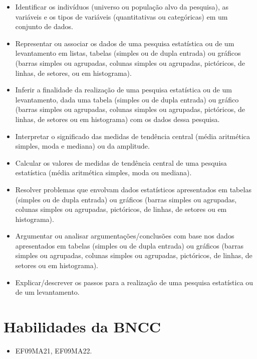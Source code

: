 \begin{itemize}

  \item Identificar os indivíduos (universo ou população alvo da pesquisa), as
variáveis e os tipos de variáveis (quantitativas ou categóricas) em um
conjunto de dados.
  \item Representar ou associar os dados de uma pesquisa estatística ou de um
levantamento em listas, tabelas (simples ou de dupla entrada) ou gráficos
(barras simples ou agrupadas, colunas simples ou agrupadas, pictóricos,
de linhas, de setores, ou em histograma).
  \item Inferir a finalidade da realização de uma pesquisa estatística ou de um
levantamento, dada uma tabela (simples ou de dupla entrada) ou gráfico
(barras simples ou agrupadas, colunas simples ou agrupadas, pictóricos,
de linhas, de setores ou em histograma) com os dados dessa pesquisa. 
  \item Interpretar o significado das medidas de tendência central (média
aritmética simples, moda e mediana) ou da amplitude. 
  \item Calcular os valores de medidas de tendência central de uma pesquisa
estatística (média aritmética simples, moda ou mediana). 
  \item Resolver problemas que envolvam dados estatísticos apresentados em
tabelas (simples ou de dupla entrada) ou gráficos (barras simples ou
agrupadas, colunas simples ou agrupadas, pictóricos, de linhas, de setores
ou em histograma). 
  \item Argumentar ou analisar argumentações/conclusões com base nos dados
apresentados em tabelas (simples ou de dupla entrada) ou gráficos (barras
simples ou agrupadas, colunas simples ou agrupadas, pictóricos, de linhas,
de setores ou em histograma). 
  \item Explicar/descrever os passos para a realização de uma pesquisa
estatística ou de um levantamento.

\end{itemize} 

\section*{Habilidades da BNCC}

\begin{itemize}
  \item EF09MA21, EF09MA22.
\end{itemize}

